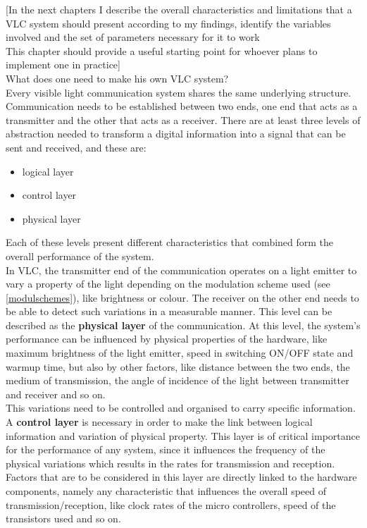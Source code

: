 
[In the next chapters I describe the overall characteristics and limitations that a VLC system should present according to my findings, identify the variables involved and the set of parameters necessary for it to work\\
This chapter should provide a useful starting point for whoever plans to implement one in practice]\\
What does one need to make his own VLC system?\\


Every visible light communication system shares the same underlying structure.
Communication needs to be established between two ends, one end that acts as a transmitter and the other that acts as a receiver.
There are at least three levels of abstraction needed to transform a digital information into a signal that can be sent and received, and these are: 
\begin{itemize}
\item logical layer
\item control layer
\item physical layer
\end{itemize}
Each of these levels present different characteristics that combined form the overall performance of the system.\\

In VLC, the transmitter end of the communication operates on a light emitter to vary a property of the light depending on the modulation scheme used (see \ref{modulschemes}), like brightness or colour.
The receiver on the other end needs to be able to detect such variations in a measurable manner.
This level can be described as the \textbf{physical layer} of the communication.
At this level, the system's performance can be influenced by physical properties of the hardware, like maximum brightness of the light emitter, speed in switching ON/OFF state and warmup time, but also by other factors, like distance between the two ends, the medium of transmission, the angle of incidence of the light between transmitter and receiver and so on.\\

This variations need to be controlled and organised to carry specific information.
A \textbf{control layer} is necessary in order to make the link between logical information and variation of physical property.
This layer is of critical importance for the performance of any system, since it influences the frequency of the physical variations which results in the rates for transmission and reception.
Factors that are to be considered in this layer are directly linked to the hardware components, namely any characteristic that influences the overall speed of transmission/reception, like clock rates of the micro controllers, speed of the transistors used and so on.\\

